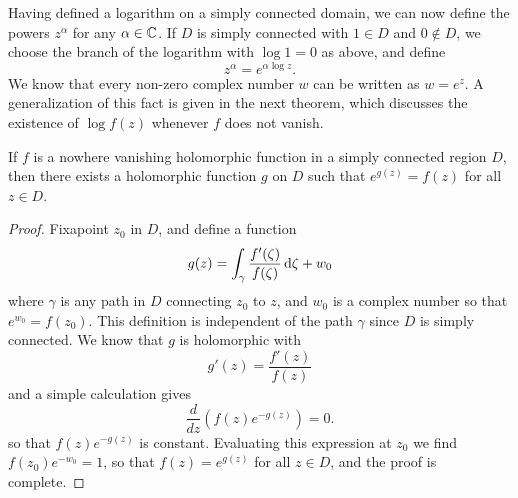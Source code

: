 Having defined a logarithm on a simply connected domain, we can now define the powers $z^{\alpha}$ for any $\alpha\in\mathbb{C}$. If $D$ is simply connected with $1\in D$ and $0\notin D$, we choose the branch of the logarithm with $\log 1=0$ as above, and define
\[z^\alpha=e^{\alpha\log z}.\]
We know that every non-zero complex number $w$ can be written as $w=e^z$. A generalization of this fact is given in the next theorem, which discusses the existence of $\log f(z)$ whenever $f$ does not vanish.
\begin{theorem}
If $f$ is a nowhere vanishing holomorphic function in a simply connected region $D$, then there exists a holomorphic function $g$ on $D$ such that $e^{g(z)}=f(z)$ for all $z\in D$.
\end{theorem}
\begin{proof}
Fixapoint $z_0$ in $D$, and define a function
\[g(z)=\int_{\gamma}\frac{f'(\zeta)}{f(\zeta)}\mathop{}\!\mathrm{d}\zeta+w_0\]
where $\gamma$ is any path in $D$ connecting $z_0$ to $z$, and $w_0$ is a complex number so that $e^{w_0}=f(z_0)$. This definition is independent of the path $\gamma$ since $D$ is simply connected. We know that $g$ is holomorphic with
\[g'(z)=\frac{f'(z)}{f(z)}\]
and a simple calculation gives 
\[\frac{d}{dz}(f(z)e^{-g(z)})=0.\]
so that $f(z)e^{-g(z)}$ is constant. Evaluating this expression at $z_0$ we find $f(z_0)e^{-w_0}=1$, so that $f(z)=e^{g(z)}$ for all $z\in D$, and the proof is complete.
\end{proof}
